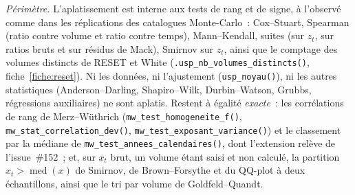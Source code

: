\documentclass[a4paper,11pt]{article}
\newcommand{\code}[1]{\texttt{\small #1}}
\begin{document}
\emph{Périmètre.} L'aplatissement est interne aux tests de rang et de signe, à l'observé comme
dans les réplications des catalogues Monte-Carlo~: Cox--Stuart, Spearman (ratio contre volume et
ratio contre temps), Mann--Kendall, suites (sur $z_t$, sur ratios bruts et sur résidus de Mack),
Smirnov sur $z_t$, ainsi que le comptage des volumes distincts de RESET et White
(\code{.usp\_nb\_volumes\_distincts()}, fiche~\ref{fiche:reset}). Ni les données, ni l'ajustement
(\code{usp\_noyau()}), ni les autres statistiques (Anderson--Darling, Shapiro--Wilk,
Durbin--Watson, Grubbs, régressions auxiliaires) ne sont aplatis. Restent à égalité \emph{exacte}~:
les corrélations de rang de Merz--Wüthrich (\code{mw\_test\_homogeneite\_f()},
\code{mw\_stat\_correlation\_dev()}, \code{mw\_test\_exposant\_variance()}) et le classement
par la médiane de \code{mw\_test\_annees\_calendaires()}, dont l'extension relève de
l'issue~\#152~; et, sur $x_t$ brut, un volume étant saisi et non calculé, la partition
$x_t > \operatorname{med}(x)$ de Smirnov, de Brown--Forsythe et du QQ-plot à deux échantillons,
ainsi que le tri par volume de Goldfeld--Quandt.
\end{document}

